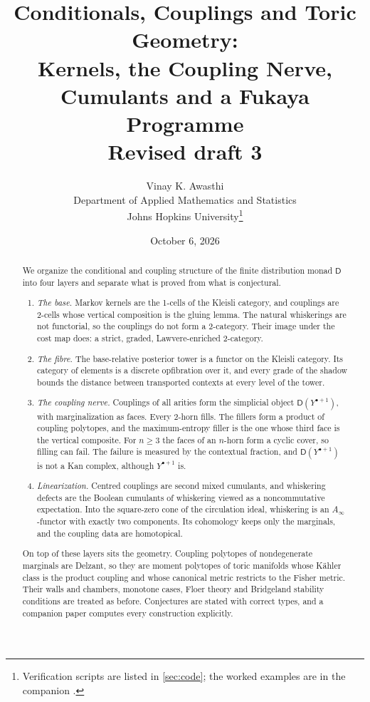 \documentclass[11pt]{article}
\title{Conditionals, Couplings and Toric Geometry:\\
Kernels, the Coupling Nerve, Cumulants and a Fukaya Programme\\[4pt]
\large Revised draft 3}
\author{Vinay K. Awasthi\\
Department of Applied Mathematics and Statistics\\
Johns Hopkins University\thanks{Verification scripts are listed in \cref{sec:code}; the worked examples are
in the companion \cite{Awasthi-Family}.}}
\date{October 6, 2026}
\theoremstyle{definition}
\theoremstyle{remark}
\newcommand{\D}{\mathsf{D}}
\begin{document}
\maketitle

\begin{abstract}
We organize the conditional and coupling structure of the finite distribution monad $\D$ into four layers
and separate what is proved from what is conjectural.
\begin{enumerate}[label=(\arabic*),leftmargin=*]
\item \emph{The base.} Markov kernels are the 1-cells of the Kleisli category, and couplings are 2-cells whose
  vertical composition is the gluing lemma. The natural whiskerings are not functorial, so the couplings do not
  form a 2-category. Their image under the cost map does: a strict, graded, Lawvere-enriched 2-category.
\item \emph{The fibre.} The base-relative posterior tower is a functor on the Kleisli category. Its category of
  elements is a discrete opfibration over it, and every grade of the shadow bounds the distance between
  transported contexts at every level of the tower.
\item \emph{The coupling nerve.} Couplings of all arities form the simplicial object $\D(Y^{\bullet+1})$, with
  marginalization as faces. Every 2-horn fills. The fillers form a product of coupling polytopes, and the
  maximum-entropy filler is the one whose third face is the vertical composite. For $n\ge3$ the faces of an
  $n$-horn form a cyclic cover, so filling can fail. The failure is measured by the contextual fraction, and
  $\D(Y^{\bullet+1})$ is not a Kan complex, although $Y^{\bullet+1}$ is.
\item \emph{Linearization.} Centred couplings are second mixed cumulants, and whiskering defects are the
  Boolean cumulants of whiskering viewed as a noncommutative expectation. Into the square-zero cone of the
  circulation ideal, whiskering is an $A_\infty$-functor with exactly two components. Its cohomology keeps
  only the marginals, and the coupling data are homotopical.
\end{enumerate}
On top of these layers sits the geometry. Coupling polytopes of nondegenerate marginals are Delzant, so they
are moment polytopes of toric manifolds whose Kähler class is the product coupling and whose canonical metric
restricts to the Fisher metric. Their walls and chambers, monotone cases, Floer theory and Bridgeland
stability conditions are treated as before. Conjectures are stated with correct types, and a companion paper
\cite{Awasthi-Family} computes every construction explicitly.
\end{abstract}
\end{document}
